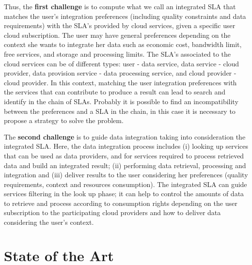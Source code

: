 Thus, the \textbf{first challenge} is to compute what we call an integrated SLA that matches the user's integration preferences (including quality constraints and data requirements) with the SLA's provided by cloud services, given a specific user cloud subscription. The user may have general preferences depending on the context she wants to integrate her data such as economic cost, bandwidth limit, free services, and storage and processing limits. The SLA's associated to the cloud services can be of different types: user - data service, data service - cloud provider, data provision service - data processing service, and cloud provider - cloud provider. In this context, matching the user integration preferences with the services that can contribute to produce a result can lead to search and identify in the chain of SLAs. Probably it is possible to find an incompatibility between the preferences and a SLA in the chain, in this case it is necessary to propose a strategy to solve the problem. 
%

The \textbf{second challenge} is to guide data integration taking into consideration the integrated SLA. Here, the data integration process includes (i) looking up services that can be used as data providers, and for services required to process retrieved data and build an integrated result; (ii) performing data retrieval, processing and integration and (iii) deliver results to the user considering her preferences (quality requirements, context and resources consumption). The integrated SLA can guide services filtering in the look up phase; it can help to control the amounts of data to retrieve and process according to consumption rights depending on the user subscription to the participating cloud providers and how to deliver data considering the user's context.


\section{State of the Art}

